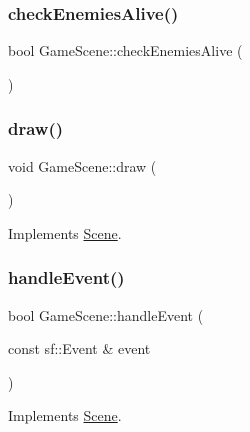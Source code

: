\subsubsection{\texorpdfstring{check\+Enemies\+Alive()}{checkEnemiesAlive()}}
{\footnotesize\ttfamily bool Game\+Scene\+::check\+Enemies\+Alive (\begin{DoxyParamCaption}{ }\end{DoxyParamCaption})}

\mbox{\label{class_game_scene_ae9eb60cbb8fa55eeb07b951e3d83f426}} 
\subsubsection{\texorpdfstring{draw()}{draw()}}
{\footnotesize\ttfamily void Game\+Scene\+::draw (\begin{DoxyParamCaption}{ }\end{DoxyParamCaption})\hspace{0.3cm}{\ttfamily [virtual]}}



Implements \hyperlink{class_scene_a789c16961aa1e316b2a4a05b95187546}{Scene}.

\mbox{\label{class_game_scene_aa494372b1f451f3c3a268558fddb30f2}} 
\subsubsection{\texorpdfstring{handle\+Event()}{handleEvent()}}
{\footnotesize\ttfamily bool Game\+Scene\+::handle\+Event (\begin{DoxyParamCaption}\item[{const sf\+::\+Event \&}]{event }\end{DoxyParamCaption})\hspace{0.3cm}{\ttfamily [virtual]}}



Implements \hyperlink{class_scene_af25e4d2c998aca4e95899fb67488e815}{Scene}.

\mbox{\label{class_game_scene_a030583d6469d9f44fda3fc5777c46a08}} 
